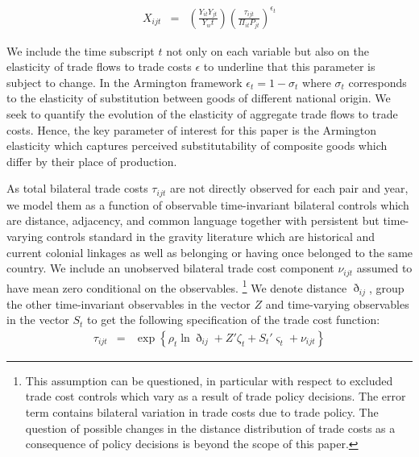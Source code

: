 \documentclass[12pt,twoside,a4paper,notitlepage]{article}
\begin{document}
\begin{eqnarray}
X_{ijt} & = & \left(\frac{Y_{it}Y_{jt}}{Y_wt}\right)\left(\frac{\tau_{ijt}}{\Pi_{it}P_{jt}}\right)^{\epsilon_t}\label{eqn:1}
\end{eqnarray}

We include the time subscript $t$ not only on each variable but also on the elasticity of trade flows to trade costs $\epsilon$ to underline that this parameter is subject to change.
In the Armington framework $\epsilon_t=1-\sigma_t$ where $\sigma_t$ corresponds to the elasticity of substitution between goods of different national origin.
We seek to quantify the evolution of the elasticity of aggregate trade flows to trade costs.
Hence, the key parameter of interest for this paper is the Armington elasticity which captures perceived substitutability of composite goods which differ by their place of production.


As total bilateral trade costs $\tau_{ijt}$ are not directly observed for each pair and year, we model them as a function of observable time-invariant bilateral controls which are distance, adjacency, and common language together with persistent but time-varying controls standard in the gravity literature which are historical and current colonial linkages as well as belonging or having once belonged to the same country.
We include an unobserved bilateral trade cost component $\nu_{ijt}$ assumed to have mean zero conditional on the observables.
\footnote{ This assumption can be questioned, in particular with respect to excluded trade cost controls which vary as a result of trade policy decisions.
	\fi The error term contains bilateral variation in trade costs due to trade policy.
	The question of possible changes in the distance distribution of trade costs as a consequence of policy decisions is beyond the scope of this paper.}
We denote distance $\eth_{ij}$, group the other time-invariant observables in the vector $Z$ and time-varying observables in the vector $S_t$ to get the following specification of the trade cost function:
\begin{eqnarray}
\tau_{ijt}&=&\exp\left\{\rho_t\ln{\eth_{ij}}+{Z}'\zeta_{t}+{S_t}'\varsigma_{t}+\nu_{ijt}\right\} \label{eqn:20}
\end{eqnarray}
\end{document}
